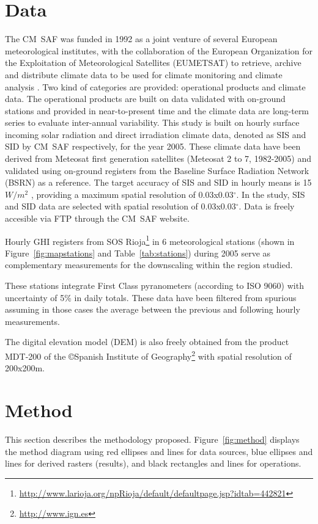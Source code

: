 \documentclass[authoryear, sort&compress]{elsarticle}
\begin{document}
\section{Data}
The CM~SAF was funded in 1992 as a joint venture of several
European meteorological institutes, with the collaboration of the
European Organization for the Exploitation of Meteorological
Satellites (EUMETSAT) to retrieve, archive and distribute climate
data to be used for climate monitoring and climate analysis
\citep{Posselt.Mueller.ea2012a}. Two kind of categories
are provided: operational products and climate data. The
operational products are built on data validated with on-ground
stations and provided in near-to-present time and the climate data
are long-term series to evaluate inter-annual variability.
This study is built on hourly surface incoming solar radiation and
direct irradiation climate data, denoted as SIS and SID by CM~SAF
respectively, for the year 2005. These climate data have been
derived from Meteosat first generation satellites (Meteosat 2 to
7, 1982-2005) and validated using on-ground registers from the
Baseline Surface Radiation Network (BSRN) as a reference. The
target accuracy of SIS and SID in hourly means is 15 $W/m^{2}$
\citep{Posselt.Muller.ea2011}, providing a maximum spatial resolution of
0.03x0.03$^\circ$. In the study, SIS and SID data are selected with
spatial resolution of 0.03x0.03$^\circ$. Data is freely accesible via
FTP through the CM~SAF website.


Hourly GHI registers from SOS
Rioja\footnote{\url{http://www.larioja.org/npRioja/default/defaultpage.jsp?idtab=442821}}
in 6 meteorological stations (shown in
Figure~\ref{fig:mapstations} and Table~\ref{tab:stations}) during
2005 serve as complementary measurements for the downscaling
within the region studied.

These stations integrate First Class pyranometers (according to ISO
9060) with uncertainty of 5\% in daily totals. These data have been
filtered from spurious assuming in those cases the average between the
previous and following hourly measurements.


The digital elevation model (DEM) is also freely obtained from the product
MDT-200 of the \copyright Spanish Institute of
Geography\footnote{\url{http://www.ign.es}} with spatial
resolution of 200x200m.

\section{Method}
\label{sec:method}
This section describes the methodology
proposed. Figure~\ref{fig:method} displays the method diagram using
red ellipses and lines for data sources, blue ellipses and lines for
derived rasters (results), and black rectangles and lines for
operations.
\end{document}
